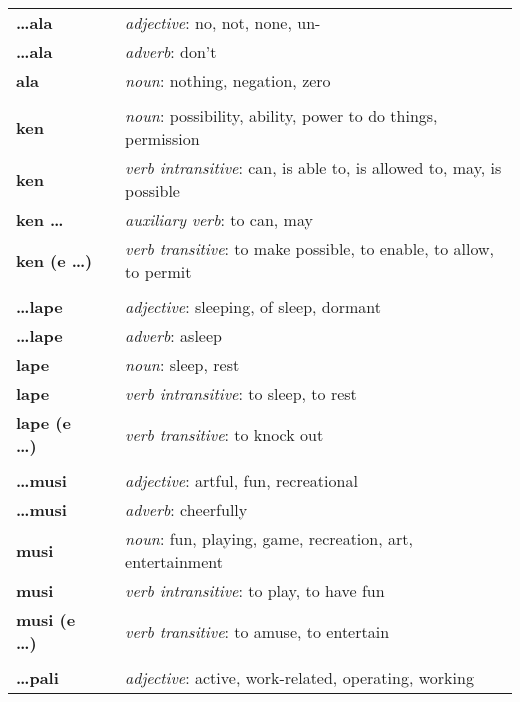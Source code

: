 \begin{supertabular}{p{2,5cm}|ll}
\textbf{\dots ala} && \textit{adjective}: no, not, none, un- \\ %
\textbf{\dots ala} && \textit{adverb}: don't \\ %
\textbf{ala} && \textit{noun}: nothing, negation, zero \\ %
 && \\ %
\textbf{ken} && \textit{noun}: possibility, ability, power to do things, permission \\ %
\textbf{ken} && \textit{verb intransitive}: can, is able to, is allowed to, may, is possible \\ %
\textbf{ken \dots} && \textit{auxiliary verb}: to can, may \\ %
\textbf{ken (e \dots)} && \textit{verb transitive}: to make possible, to enable, to allow, to permit \\ %
 && \\ %
\textbf{\dots lape} && \textit{adjective}: sleeping, of sleep, dormant \\ %
\textbf{\dots lape} && \textit{adverb}: asleep \\ %
\textbf{lape} && \textit{noun}: sleep, rest \\ %
\textbf{lape} && \textit{verb intransitive}: to sleep, to rest \\ %
\textbf{lape (e \dots)} && \textit{verb transitive}: to knock out \\ %
 && \\ %
\textbf{\dots musi} && \textit{adjective}: artful, fun, recreational \\ %
\textbf{\dots musi} && \textit{adverb}: cheerfully \\ %
\textbf{musi} && \textit{noun}: fun, playing, game, recreation, art, entertainment \\ %
\textbf{musi} && \textit{verb intransitive}: to play, to have fun \\ %
\textbf{musi (e \dots)} && \textit{verb transitive}: to amuse, to entertain \\ %
 && \\ %
\textbf{\dots pali} && \textit{adjective}: active, work-related, operating, working \\ %

\end{supertabular}
